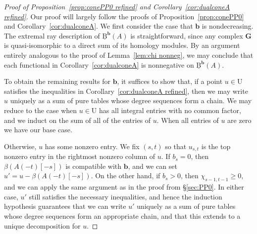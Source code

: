 \documentclass[12pt]{amsart}
\theoremstyle{definition}
\theoremstyle{remark}
\newcommand{\UU}{\mathrm{U}}
\newcommand{\bb}{\mathbf{b}}
\newcommand{\Gbull}{\mathbf{G}}
\newcommand{\BBQ}{\underline{\mathrm{B}}}
\begin{document}
\begin{proof}[Proof of Proposition~\ref{prop:conePP0 refined} and Corollary~\ref{cor:dualconeA refined}]
Our proof will largely follow the proofs of Proposition~\ref{prop:conePP0} and Corollary~\ref{cor:dualconeA}.  We first consider the case that $\bb$ is nondecreasing.  The extremal ray description of $\BBQ^{\bb}(A)$ is straightforward, since any complex $\Gbull$ is quasi-isomorphic to a direct sum of its homology modules.  By an argument entirely analogous to the proof of Lemma~\ref{lem:chi nonneg}, we may conclude that each functional in Corollary~\ref{cor:dualconeA} is nonnegative on $\BBQ^{\bb}(A)$.

To obtain the remaining results for $\bb$, it suffices to show that, if a point $u\in \UU$ satisfies the inequalities in Corollary~\ref{cor:dualconeA refined}, then we may write $u$ uniquely as a sum of pure tables whose degree sequences form a chain.  We may reduce to the case when $u\in \UU$ has all integral entries with no common factor, and we induct on the sum of all of the entries of $u$.  When all entries of $u$ are zero we have our base case.  

Otherwise, $u$ has some nonzero entry.  We fix $(s,t)$ so that $u_{s,t}$ is the top nonzero entry in the rightmost nonzero column of $u$.  If $b_s=0$, then $\beta(A(-t)[-s])$ is compatible with $\bb$, and we can set $u'=u-\beta(A(-t)[-s])$.  On the other hand, if $b_s>0$, then $\chi_{s-1,t-1}\geq 0$, and we can apply the same argument as in the proof from \S\ref{sec:PP0}.  In either case, $u'$ still satisfies the necessary inequalities, and hence the induction hypothesis guarantees that we can write $u'$ uniquely as a sum of pure tables whose degree sequences form an appropriate chain, and that this extends to a unique decomposition for $u$.


\end{proof}
\end{document}
